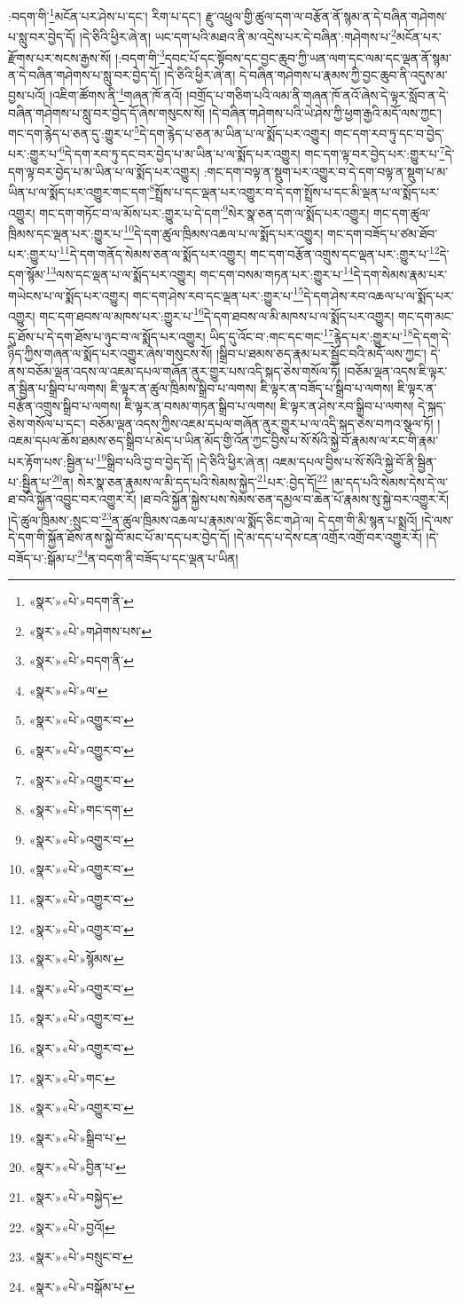 :བདག་གི་\footnote{«སྣར་»«པེ་»བདག་ནི་}མངོན་པར་ཤེས་པ་དང་། རིག་པ་དང་། རྫུ་འཕྲུལ་གྱི་ཚུལ་དག་ལ་བརྩོན་ནོ་སྙམ་ན་དེ་བཞིན་གཤེགས་པ་སླུ་བར་བྱེད་དོ། །དེ་ཅིའི་ཕྱིར་ཞེ་ན། ཡང་དག་པའི་མཐའ་ནི་མ་འདྲེས་པར་དེ་བཞིན་:གཤེགས་པ་\footnote{«སྣར་»«པེ་»གཤེགས་པས་}མངོན་པར་རྫོགས་པར་སངས་རྒྱས་སོ། །:བདག་གི་\footnote{«སྣར་»«པེ་»བདག་ནི་}དབང་པོ་དང་སྟོབས་དང་བྱང་ཆུབ་ཀྱི་ཡན་ལག་དང་ལམ་དང་ལྡན་ནོ་སྙམ་ན་དེ་བཞིན་གཤེགས་པ་སླུ་བར་བྱེད་དོ། །དེ་ཅིའི་ཕྱིར་ཞེ་ན། དེ་བཞིན་གཤེགས་པ་རྣམས་ཀྱི་བྱང་ཆུབ་ནི་འདུས་མ་བྱས་པའོ། །འཇིག་ཚོགས་ནི་\footnote{«སྣར་»«པེ་»ལ་}གཞན་ཁོ་ནའོ། །བགྲོད་པ་གཅིག་པའི་ལམ་ནི་གཞན་ཁོ་ནའོ་ཞེས་དེ་ལྟར་སློབ་ན་དེ་བཞིན་གཤེགས་པ་སླུ་བར་བྱེད་དོ་ཞེས་གསུངས་སོ། །དེ་བཞིན་གཤེགས་པའི་ཡེ་ཤེས་ཀྱི་ཕྱག་རྒྱའི་མདོ་ལས་ཀྱང་། གང་དག་རྙེད་པ་ཅན་དུ་:གྱུར་པ་\footnote{«སྣར་»«པེ་»འགྱུར་བ་}དེ་དག་རྙེད་པ་ཅན་མ་ཡིན་པ་ལ་སྨོད་པར་འགྱུར། གང་དག་རབ་ཏུ་དང་བ་བྱེད་པར་:གྱུར་པ་\footnote{«སྣར་»«པེ་»འགྱུར་བ་}དེ་དག་རབ་ཏུ་དང་བར་བྱེད་པ་མ་ཡིན་པ་ལ་སྨོད་པར་འགྱུར། གང་དག་ལྟ་བར་བྱེད་པར་:གྱུར་པ་\footnote{«སྣར་»«པེ་»འགྱུར་བ་}དེ་དག་ལྟ་བར་བྱེད་པ་མ་ཡིན་པ་ལ་སྨོད་པར་འགྱུར། :གང་དག་བལྟ་ན་སྡུག་པར་འགྱུར་བ་དེ་དག་བལྟ་ན་སྡུག་པ་མ་ཡིན་པ་ལ་སྨོད་པར་འགྱུར་གང་དག་\footnote{«སྣར་»«པེ་»གང་དག་}སྤྲོས་པ་དང་ལྡན་པར་འགྱུར་བ་དེ་དག་སྤྲོས་པ་དང་མི་ལྡན་པ་ལ་སྨོད་པར་འགྱུར། གང་དག་གཏོང་བ་ལ་མོས་པར་:གྱུར་པ་དེ་དག་\footnote{«སྣར་»«པེ་»འགྱུར་བ་}སེར་སྣ་ཅན་དག་ལ་སྨོད་པར་འགྱུར། གང་དག་ཚུལ་ཁྲིམས་དང་ལྡན་པར་:གྱུར་པ་\footnote{«སྣར་»«པེ་»འགྱུར་བ་}དེ་དག་ཚུལ་ཁྲིམས་འཆལ་པ་ལ་སྨོད་པར་འགྱུར། གང་དག་བཟོད་པ་ཙམ་ཐོབ་པར་:གྱུར་པ་\footnote{«སྣར་»«པེ་»འགྱུར་བ་}དེ་དག་གནོད་སེམས་ཅན་ལ་སྨོད་པར་འགྱུར། གང་དག་བརྩོན་འགྲུས་དང་ལྡན་པར་:གྱུར་པ་\footnote{«སྣར་»«པེ་»འགྱུར་བ་}དེ་དག་སྙོམ་\footnote{«སྣར་»«པེ་»སྙོམས་}ལས་དང་ལྡན་པ་ལ་སྨོད་པར་འགྱུར། གང་དག་བསམ་གཏན་པར་:གྱུར་པ་\footnote{«སྣར་»«པེ་»འགྱུར་བ་}དེ་དག་སེམས་རྣམ་པར་གཡེངས་པ་ལ་སྨོད་པར་འགྱུར། གང་དག་ཤེས་རབ་དང་ལྡན་པར་:གྱུར་པ་\footnote{«སྣར་»«པེ་»འགྱུར་བ་}དེ་དག་ཤེས་རབ་འཆལ་པ་ལ་སྨོད་པར་འགྱུར། གང་དག་ཐབས་ལ་མཁས་པར་:གྱུར་པ་\footnote{«སྣར་»«པེ་»འགྱུར་བ་}དེ་དག་ཐབས་ལ་མི་མཁས་པ་ལ་སྨོད་པར་འགྱུར། གང་དག་མང་དུ་ཐོས་པ་དེ་དག་ཐོས་པ་ཉུང་བ་ལ་སྨོད་པར་འགྱུར། ཡིད་དུ་འོང་བ་:གང་དང་གང་\footnote{«སྣར་»«པེ་»གང་}རྙེད་པར་:གྱུར་པ་\footnote{«སྣར་»«པེ་»འགྱུར་བ་}དེ་དག་དེ་ཉིད་ཀྱིས་གཞན་ལ་སྨོད་པར་འགྱུར་ཞེས་གསུངས་སོ། །སྒྲིབ་པ་ཐམས་ཅད་རྣམ་པར་སྦྱོང་བའི་མདོ་ལས་ཀྱང་། དེ་ནས་བཅོམ་ལྡན་འདས་ལ་འཇམ་དཔལ་གཞོན་ནུར་གྱུར་པས་འདི་སྐད་ཅེས་གསོལ་ཏོ། །བཅོམ་ལྡན་འདས་ཇི་ལྟར་ན་སྦྱིན་པ་སྒྲིབ་པ་ལགས། ཇི་ལྟར་ན་ཚུལ་ཁྲིམས་སྒྲིབ་པ་ལགས། ཇི་ལྟར་ན་བཟོད་པ་སྒྲིབ་པ་ལགས། ཇི་ལྟར་ན་བརྩོན་འགྲུས་སྒྲིབ་པ་ལགས། ཇི་ལྟར་ན་བསམ་གཏན་སྒྲིབ་པ་ལགས། ཇི་ལྟར་ན་ཤེས་རབ་སྒྲིབ་པ་ལགས། དེ་སྐད་ཅེས་གསོལ་པ་དང་། བཅོམ་ལྡན་འདས་ཀྱིས་འཇམ་དཔལ་གཞོན་ནུར་གྱུར་པ་ལ་འདི་སྐད་ཅེས་བཀའ་སྩལ་ཏོ། །འཇམ་དཔལ་ཆོས་ཐམས་ཅད་སྒྲིབ་པ་མེད་པ་ཡིན་མོད་གྱི་འོན་ཀྱང་བྱིས་པ་སོ་སོའི་སྐྱེ་བོ་རྣམས་ལ་རང་གི་རྣམ་པར་རྟོག་པས་:སྦྱིན་པ་\footnote{«སྣར་»«པེ་»སྒྲིབ་པ་}སྒྲིབ་པའི་བྱ་བ་བྱེད་དོ། །དེ་ཅིའི་ཕྱིར་ཞེ་ན། འཇམ་དཔལ་བྱིས་པ་སོ་སོའི་སྐྱེ་བོ་ནི་སྦྱིན་པ་:སྦྱིན་པ་\footnote{«སྣར་»«པེ་»བྱིན་པ་}ན། སེར་སྣ་ཅན་རྣམས་ལ་མི་དད་པའི་སེམས་སྐྱེད་\footnote{«སྣར་»«པེ་»བསྐྱེད་}པར་:བྱེད་དོ།\footnote{«སྣར་»«པེ་»བྱའོ།} །མ་དད་པའི་སེམས་དེས་དེ་ལ་ཐ་བའི་སྐྱོན་འབྱུང་བར་འགྱུར་རོ། །ཐ་བའི་སྐྱོན་སྐྱེས་པས་སེམས་ཅན་དམྱལ་བ་ཆེན་པོ་རྣམས་སུ་སྐྱེ་བར་འགྱུར་རོ། །དེ་ཚུལ་ཁྲིམས་:སྲུང་བ་\footnote{«སྣར་»«པེ་»བསྲུང་བ་}ན་ཚུལ་ཁྲིམས་འཆལ་པ་རྣམས་ལ་སྨོད་ཅིང་གཤེ་ལ། དེ་དག་གི་མི་སྙན་པ་སྨྲའོ། །དེ་ལས་དེ་དག་གི་སྐྱོན་ཐོས་ནས་སྐྱེ་བོ་མང་པོ་མ་དད་པར་བྱེད་དོ། །དེ་མ་དད་པ་དེས་ངན་འགྲོར་འགྲོ་བར་འགྱུར་རོ། །དེ་བཟོད་པ་:སྒོམ་པ་\footnote{«སྣར་»«པེ་»བསྒོམ་པ་}ན་བདག་ནི་བཟོད་པ་དང་ལྡན་པ་ཡིན། 